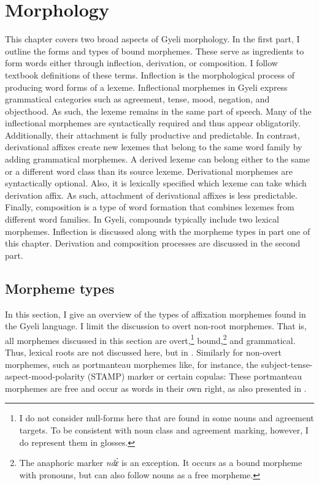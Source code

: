 \chapter{Morphology}
\label{sec:WordForm}

This chapter covers two broad aspects of Gyeli morphology. In the first part, I outline the  forms and types of bound morphemes. These serve as ingredients to form words either through inflection,  derivation, or composition. I follow  textbook definitions of these terms. Inflection is the morphological process of producing word forms of a lexeme. Inflectional morphemes in Gyeli express grammatical categories such as agreement, tense, mood, negation, and objecthood. As such, the lexeme remains in the same part of speech. Many of the inflectional morphemes are  syntactically required and thus appear obligatorily. Additionally, their attachment is fully productive and predictable. In contrast, derivational affixes create new lexemes that belong to the same word family by adding grammatical morphemes. A derived lexeme can belong either to the same or a different word class than its source lexeme. Derivational morphemes are syntactically optional. Also, it is lexically specified which lexeme can take which derivation affix. As such, attachment of derivational affixes is less predictable. Finally, composition is a type of word formation that combines lexemes from different word families. In Gyeli, compounds typically include two lexical morphemes.    Inflection is discussed along with the morpheme types in part one of this chapter. Derivation and composition processes are discussed in the second part.

\section{Morpheme types}
\label{sec:MorphType}

In this section, I give an overview of the types of affixation morphemes found in the Gyeli language. I limit the discussion to overt non-root morphemes. That is, all morphemes discussed in this section are overt,\footnote{I do not consider null-forms here that are found in some nouns and agreement targets. To be consistent with noun class and agreement marking, however, I do represent them in glosses.}  bound,\footnote{The anaphoric marker {\itshape ndɛ̀} is an exception. It occurs as a bound morpheme with pronouns, but can also follow nouns as a free morpheme.} and grammatical.  Thus, lexical roots are not discussed here, but in . Similarly for non-overt morphemes, such as portmanteau morphemes like, for instance, the subject-tense-aspect-mood-polarity (STAMP) marker or certain copulas: These portmanteau morphemes are free and occur as words in their own right, as also presented in . 

